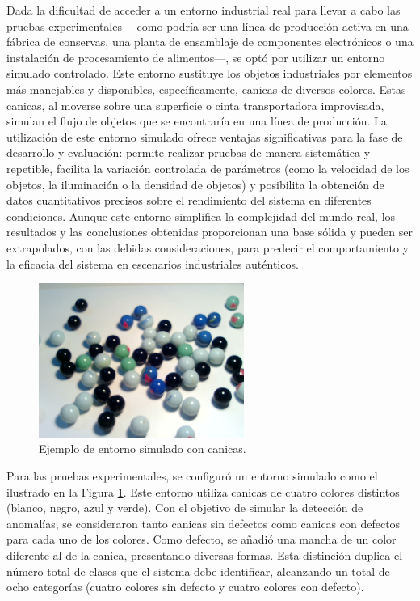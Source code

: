 \documentclass[11pt,spanish,listoffigures,listoftables]{tfgetsinf}
\begin{document}
Dada la dificultad de acceder a un entorno industrial real para llevar a cabo las pruebas experimentales —como podría ser una línea de producción activa en una fábrica de conservas, una planta de ensamblaje de componentes electrónicos o una instalación de procesamiento de alimentos—, se optó por utilizar un entorno simulado controlado. Este entorno sustituye los objetos industriales por elementos más manejables y disponibles, específicamente, canicas de diversos colores. Estas canicas, al moverse sobre una superficie o cinta transportadora improvisada, simulan el flujo de objetos que se encontraría en una línea de producción. La utilización de este entorno simulado ofrece ventajas significativas para la fase de desarrollo y evaluación: permite realizar pruebas de manera sistemática y repetible, facilita la variación controlada de parámetros (como la velocidad de los objetos, la iluminación o la densidad de objetos) y posibilita la obtención de datos cuantitativos precisos sobre el rendimiento del sistema en diferentes condiciones. Aunque este entorno simplifica la complejidad del mundo real, los resultados y las conclusiones obtenidas proporcionan una base sólida y pueden ser extrapolados, con las debidas consideraciones, para predecir el comportamiento y la eficacia del sistema en escenarios industriales auténticos.

\begin{figure}[H]
   \centering
   \includegraphics[width=0.6\textwidth]{images/diseno_e_implementacion/ejemplo_canicas.png}
   \caption[Ejemplo de entorno simulado con canicas]{Ejemplo de entorno simulado con canicas.}
   \label{fig:entorno_simulado}
\end{figure}

Para las pruebas experimentales, se configuró un entorno simulado como el ilustrado en la Figura \ref{fig:entorno_simulado}. Este entorno utiliza canicas de cuatro colores distintos (blanco, negro, azul y verde). Con el objetivo de simular la detección de anomalías, se consideraron tanto canicas sin defectos como canicas con defectos para cada uno de los colores. Como defecto, se añadió una mancha de un color diferente al de la canica, presentando diversas formas. Esta distinción duplica el número total de clases que el sistema debe identificar, alcanzando un total de ocho categorías (cuatro colores sin defecto y cuatro colores con defecto).
\end{document}
